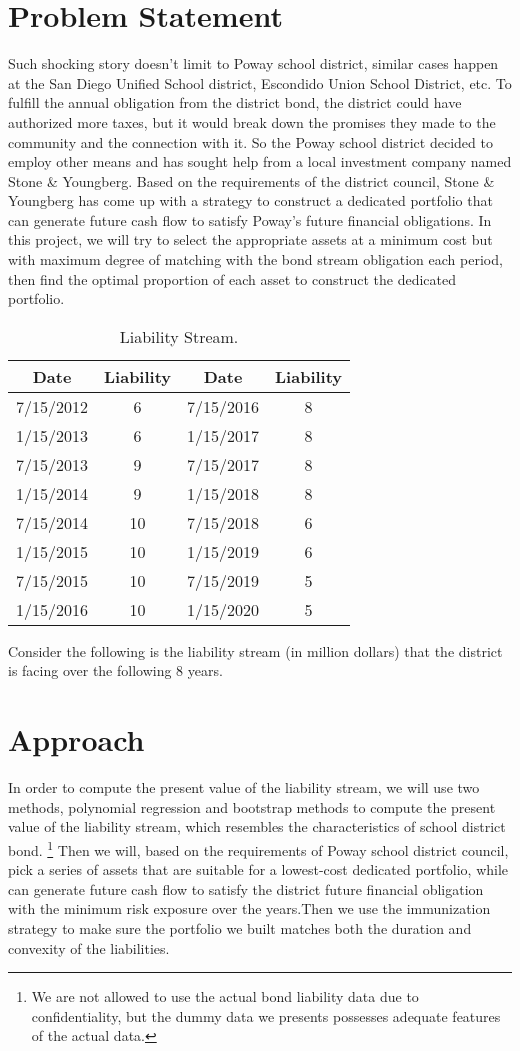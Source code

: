 \documentclass[12pt,letterpaper]{article}
\theoremstyle{definition}
\begin{document}
\section{Problem Statement}
Such shocking story doesn't limit to Poway school district, similar cases happen at the San Diego Unified School district, Escondido Union School District, etc. To fulfill the annual obligation from the district bond, the district could have authorized more taxes, but it would break down the promises they made to the community and the connection with it. So the Poway school district decided to employ other means and has sought help from a local investment company named Stone \& Youngberg.  Based on the requirements of the district  council, Stone \& Youngberg has come up with a strategy to construct a dedicated portfolio that can generate future cash flow to satisfy Poway's future financial obligations. In this project, we will try to select the appropriate assets at a minimum cost but with maximum degree of matching with the bond stream obligation each period, then find the optimal proportion of each asset to construct the dedicated portfolio.
\begin{table}[h]
\centering  
\begin{tabular}{cccc}
\hline
Date  &Liability  &Date  &Liability\\ \hline  
7/15/2012  &6  &7/15/2016  &8\\
1/15/2013  &6  &1/15/2017  &8\\ 
7/15/2013  &9  &7/15/2017  &8\\ 
1/15/2014  &9  &1/15/2018  &8\\ 
7/15/2014  &10 &7/15/2018  &6\\ 
1/15/2015  &10  &1/15/2019  &6\\ 
7/15/2015  &10  &7/15/2019  &5 \\ 
1/15/2016  &10  &1/15/2020  &5\\ \hline
\end{tabular}
\caption{Liability Stream.}
\end{table}
Consider the following is the liability stream (in million dollars) that the district is facing over the following 8 years.

\section{Approach}
In order to compute the present value of the liability stream, we will use two methods, polynomial regression and bootstrap methods to compute the present value of the liability stream, which resembles the characteristics of school district bond. 
\footnote{We are not allowed to use the actual bond liability data due to confidentiality, but the dummy data we presents possesses adequate features of the actual data.}
Then we will, based on the requirements of Poway school district council, pick a series of assets that are suitable for a lowest-cost dedicated portfolio, while can generate future cash flow to satisfy the  district future financial obligation with the minimum risk exposure over the years.Then we use the immunization strategy to make sure the portfolio we built matches both the duration and convexity of the liabilities.
\end{document}
